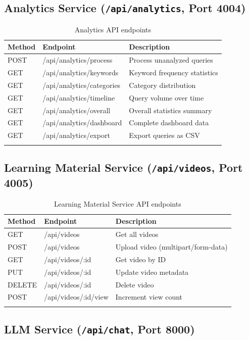 \documentclass[a4paper,12pt]{report}
\begin{document}
\subsection{Analytics Service (\texttt{/api/analytics}, Port 4004)}

\begin{longtable}{llp{6cm}}
    \toprule
    \textbf{Method} & \textbf{Endpoint} & \textbf{Description} \\
    \midrule
    \endhead
    POST & /api/analytics/process & Process unanalyzed queries \\
    GET & /api/analytics/keywords & Keyword frequency statistics \\
    GET & /api/analytics/categories & Category distribution \\
    GET & /api/analytics/timeline & Query volume over time \\
    GET & /api/analytics/overall & Overall statistics summary \\
    GET & /api/analytics/dashboard & Complete dashboard data \\
    GET & /api/analytics/export & Export queries as CSV \\
    \bottomrule
\caption{Analytics API endpoints}
\end{longtable}

\subsection{Learning Material Service (\texttt{/api/videos}, Port 4005)}

\begin{longtable}{llp{6cm}}
    \toprule
    \textbf{Method} & \textbf{Endpoint} & \textbf{Description} \\
    \midrule
    \endhead
    GET & /api/videos & Get all videos \\
    POST & /api/videos & Upload video (multipart/form-data) \\
    GET & /api/videos/:id & Get video by ID \\
    PUT & /api/videos/:id & Update video metadata \\
    DELETE & /api/videos/:id & Delete video \\
    POST & /api/videos/:id/view & Increment view count \\
    \bottomrule
\caption{Learning Material Service API endpoints}
\end{longtable}

\subsection{LLM Service (\texttt{/api/chat}, Port 8000)}
\end{document}
